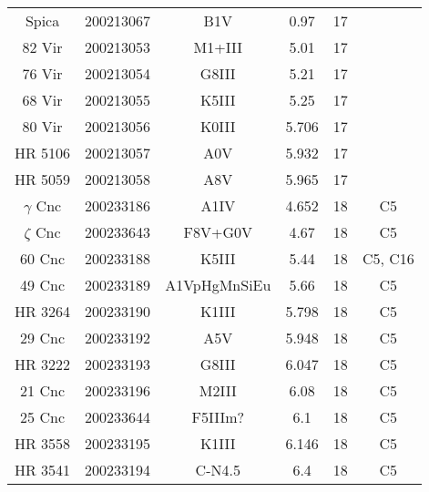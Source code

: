 \begin{table*}
\begin{tabular}{cccccc}
Spica & 200213067 & B1V & 0.97 & 17 &  \\
82 Vir & 200213053 & M1+III & 5.01 & 17 &  \\
76 Vir & 200213054 & G8III & 5.21 & 17 &  \\
68 Vir & 200213055 & K5III & 5.25 & 17 &  \\
80 Vir & 200213056 & K0III & 5.706 & 17 &  \\
HR 5106 & 200213057 & A0V & 5.932 & 17 &  \\
HR 5059 & 200213058 & A8V & 5.965 & 17 &  \\
$\gamma$ Cnc & 200233186 & A1IV & 4.652 & 18 & C5 \\
$\zeta$ Cnc & 200233643 & F8V+G0V & 4.67 & 18 & C5 \\
60 Cnc & 200233188 & K5III & 5.44 & 18 & C5, C16 \\
49 Cnc & 200233189 & A1VpHgMnSiEu & 5.66 & 18 & C5 \\
HR 3264 & 200233190 & K1III & 5.798 & 18 & C5 \\
29 Cnc & 200233192 & A5V & 5.948 & 18 & C5 \\
HR 3222 & 200233193 & G8III & 6.047 & 18 & C5 \\
21 Cnc & 200233196 & M2III & 6.08 & 18 & C5 \\
25 Cnc & 200233644 & F5IIIm? & 6.1 & 18 & C5 \\
HR 3558 & 200233195 & K1III & 6.146 & 18 & C5 \\
HR 3541 & 200233194 & C-N4.5 & 6.4 & 18 & C5 \\
\hline
\end{tabular}
\end{table*}
